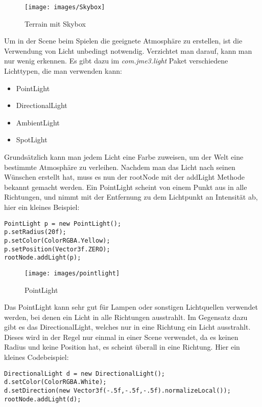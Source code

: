 \begin{figure}[h!]
		\caption{Terrain mit Skybox}
		
		\centering\texttt{[image: images/Skybox]} 
		
\end{figure} 
\newpage



Um in der Scene beim Spielen die geeignete Atmosphäre zu erstellen, ist die Verwendung von Licht unbedingt notwendig. Verzichtet man darauf, kann man nur wenig erkennen. Es gibt dazu im \emph{com.jme3.light} Paket verschiedene Lichttypen, die man verwenden kann:
\begin{itemize}
	\item PointLight
	\item DirectionalLight
	\item AmbientLight
	\item SpotLight
\end{itemize}
Grundsätzlich kann man jedem Licht eine Farbe zuweisen, um der Welt eine bestimmte Atmosphäre zu verleihen. Nachdem man das Licht nach seinen Wünschen erstellt hat, muss es nun der rootNode mit der addLight Methode bekannt gemacht werden. Ein PointLight scheint von einem Punkt aus in alle Richtungen, und nimmt mit der Entfernung zu dem Lichtpunkt an Intensität ab, hier ein kleines Beispiel:
\begin{lstlisting}
PointLight p = new PointLight();
p.setRadius(20f);
p.setColor(ColorRGBA.Yellow);
p.setPosition(Vector3f.ZERO);
rootNode.addLight(p);
\end{lstlisting}

\begin{figure}[h!]
	
	
	\caption{PointLight}
	
	\centering\texttt{[image: images/pointlight]} 
	
\end{figure}
Das PointLight kann sehr gut für Lampen oder sonstigen Lichtquellen verwendet werden, bei denen ein Licht in alle Richtungen ausstrahlt. Im Gegensatz dazu gibt es das DirectionalLight, welches nur in eine Richtung ein Licht ausstrahlt. Dieses wird in der Regel nur einmal in einer Scene verwendet, da es keinen Radius und keine Position hat, es scheint überall in eine Richtung. Hier ein kleines Codebeispiel:
\begin{lstlisting}
DirectionalLight d = new DirectionalLight();
d.setColor(ColorRGBA.White);
d.setDirection(new Vector3f(-.5f,-.5f,-.5f).normalizeLocal());
rootNode.addLight(d);
\end{lstlisting}

